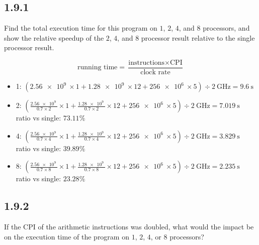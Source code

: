 \documentclass[paper=a4, fontsize=11pt]{scrartcl} %
\begin{document}
\subsection{1.9.1}
\begin{fancyquotes}
  Find the total execution time for this program on $1$, $2$, $4$,
  and $8$ processors, and show the relative speedup of the $2$, $4$,
  and $8$ processor result relative to the single processor result.
\end{fancyquotes}

$$\text{running time} =
\frac{\text{instructions}\times\text{CPI}}{\text{clock rate}}$$

\begin{itemize}
\item{1:} $(\SI{2.56e9}{}\times 1 + \SI{1.28e9}{}\times 12 +
  \SI{256e6}{}\times 5) \div \SI{2}{\giga\hertz} = \SI{9.6}{\second}$
\item{2:} $(\frac{\SI{2.56e9}{}}{0.7\times 2}\times 1 +
  \frac{\SI{1.28e9}{}}{0.7\times 2}\times 12 + \SI{256e6}{}\times 5)
  \div \SI{2}{\giga\hertz} = \SI{7.019}{\second}$\\
  ratio vs single: $73.11\%$
\item{4:} $(\frac{\SI{2.56e9}{}}{0.7\times 4}\times 1 +
  \frac{\SI{1.28e9}{}}{0.7\times 4}\times 12 + \SI{256e6}{}\times 5)
  \div \SI{2}{\giga\hertz} = \SI{3.829}{\second}$\\
  ratio vs single: $39.89\%$
\item{8:} $(\frac{\SI{2.56e9}{}}{0.7\times 8}\times 1 +
  \frac{\SI{1.28e9}{}}{0.7\times 8}\times 12 + \SI{256e6}{}\times 5)
  \div \SI{2}{\giga\hertz} = \SI{2.235}{\second}$\\
  ratio vs single: $23.28\%$
\end{itemize}

\subsection{1.9.2}
\begin{fancyquotes}
  If the CPI of the arithmetic instructions was doubled, what would
  the impact be on the execution time of the program on $1$, $2$,
  $4$, or $8$ processors?
\end{fancyquotes}
\end{document}
